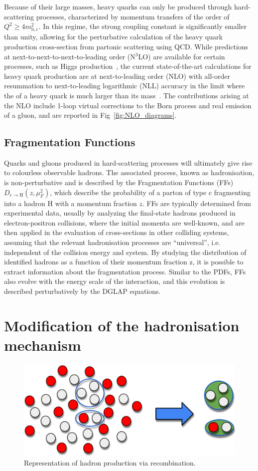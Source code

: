 Because of their large masses, heavy quarks can only be produced through hard-scattering processes, characterized by momentum transfers of the order of $Q^2 \geq 4m^2_\mathrm{b,c}$. In this regime, the strong coupling constant is significantly smaller than unity, allowing for the perturbative calculation of the heavy quark production cross-section from partonic scattering using QCD. While predictions at next-to-next-to-next-to-leading order (N$^3$LO) are available for certain processes, such as Higgs production~\cite{Anastasiou:2015vya, Anastasiou:2016cez}, the current state-of-the-art calculations for heavy quark production are at next-to-leading order (NLO) with all-order resummation to next-to-leading logarithmic (NLL) accuracy in the limit where the \pt of a heavy quark is much larger than its mass~\cite{Cacciari:1998it}. The contributions arising at the NLO include 1-loop virtual corrections to the Born process and real emission of a gluon, and are reported in Fig~\ref{fig:NLO_diagrams}.

\subsection{Fragmentation Functions}
Quarks and gluons produced in hard-scattering processes will ultimately give rise to colourless observable hadrons. The associated process, known as hadronisation, is non-perturbative and is described by the Fragmentation Functions (FFs) $D_\mathrm{c\rightarrow H}(z,\mu_F^2)$, which describe the probability of a parton of type c fragmenting into a hadron H with a momentum fraction $z$. FFs are typically determined from experimental data, usually by analyzing the final-state hadrons produced in electron-positron collisions, where the initial momenta are well-known, and are then applied in the evaluation of cross-sections in other colliding systems, assuming that the relevant hadronisation processes are “universal”, i.e. independent of the collision energy and system. By studying the distribution of identified hadrons as a function of their momentum fraction z, it is possible to extract information about the fragmentation process. Similar to the PDFs, FFs also evolve with the energy scale of the interaction, and this evolution is described perturbatively by the DGLAP equations. 
\section{Modification of the hadronisation mechanism}
\begin{figure}[htb]
    \centering
    \includegraphics[width=0.7\linewidth]{Figures/Chapter 2/Coalescence.png}
    \caption{Representation of hadron production via recombination.}
\end{figure}


